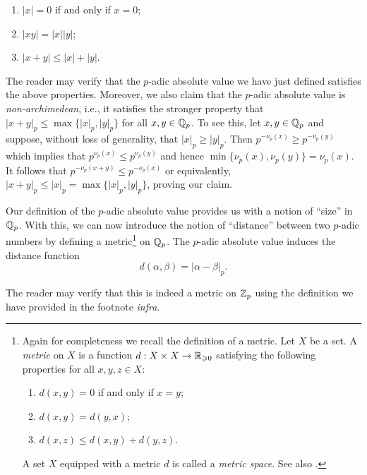 \smallskip

\begin{enumerate}[nosep, label=(\roman*)]
    \item \(|x| = 0\) if and only if \(x = 0\);\label{item:abs-val-zero}
    \item \(|xy| = |x||y|\);\label{item:abs-val-product}
    \item \(|x + y| \leq |x| + |y|\).\label{item:abs-val-sum}
\end{enumerate}

The reader may verify that the \(p\)-adic absolute value we have just defined
satisfies the above properties. Moreover, we also claim that the \(p\)-adic
absolute value is \emph{non-archimedean}, i.e., it satisfies the stronger
property that \(|x + y|_p \leq \max\{|x|_p, |y|_p\}\) for all \(x, y \in
\mathbb{Q}_p\). To see this, let \(x, y \in \mathbb{Q}_p\) and suppose, without
loss of generality, that \(|x|_p \geq |y|_p\). Then \(p^{-\nu_p(x)} \geq
p^{-\nu_p(y)}\) which implies that \(p^{\nu_p(x)} \leq p^{\nu_p(y)}\) and hence
\(\min\{\nu_p(x), \nu_p(y)\} = \nu_p(x)\). It follows that \(p^{-\nu_p(x + y)}
\leq p^{-\nu_p(x)}\) or equivalently, \(|x + y|_p \leq |x|_p = \max\{|x|_p,
|y|_p\}\), proving our claim.

Our definition of the \(p\)-adic absolute value provides us with a notion of
    ``size'' in \(\mathbb{Q}_p\). With this, we can now introduce the notion of
    ``distance'' between two \(p\)-adic numbers by defining a metric\footnote{
    Again for completeness we recall the definition of a metric. Let \(X\) be a
    set. A \emph{metric} on \(X\) is a function \(d : X \times X \to
    \mathbb{R}_{\geqslant 0}\) satisfying the following properties for all \(x, y, z \in
    X\):
    \begin{enumerate}[nosep, label=(\roman*)]
        \item \(d(x, y) = 0\) if and only if \(x = y\);\label{item:metric-zero}
        \item \(d(x, y) = d(y, x)\);\label{item:metric-symmetry}
        \item \(d(x, z) \leq d(x, y) + d(y, z)\).\label{item:metric-triangle}
    \end{enumerate}
    A set \(X\) equipped with a metric \(d\) is called a \emph{metric space}.
See also \cite[p.~30]{rudin1976principles}. } on \(\mathbb{Q}_p\). The
\(p\)-adic absolute value induces the distance function
\[
  d(\alpha, \beta) = |\alpha - \beta|_p.
\]

The reader may verify that this is indeed a metric on \(\mathbb{Z}_p\) using the
definition we have provided in the footnote \emph{infra}.

